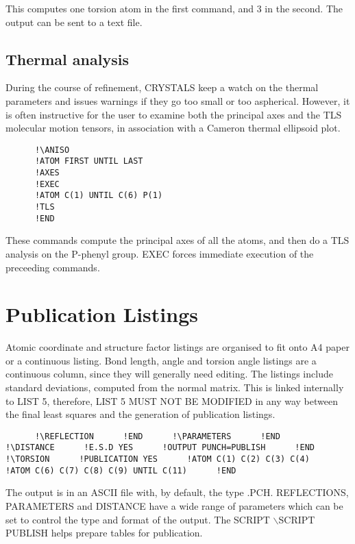 \documentclass[10pt,a4paper]{report}
\begin{document}
This computes one torsion atom in the first command, and 3 in the second.
 The output can be sent to a text file.




\section{Thermal analysis}


During the course of refinement, CRYSTALS keep a watch on the thermal
 parameters and issues warnings if they go too small or too aspherical.
 However, it is often instructive for the user to examine both the principal
 axes and the TLS molecular motion tensors, in
 association with a Cameron thermal ellipsoid plot.

\small\begin{verbatim}
      !\ANISO
      !ATOM FIRST UNTIL LAST
      !AXES
      !EXEC
      !ATOM C(1) UNTIL C(6) P(1)
      !TLS
      !END
\end{verbatim}\normalsize




These commands compute the principal axes of all the atoms, and then do a
 TLS analysis on the P-phenyl group. EXEC forces immediate execution of the
 preceeding commands.




\chapter{Publication Listings}


Atomic coordinate and structure factor listings are organised to fit onto A4 paper or a continuous listing. Bond length, angle and torsion angle listings are a continuous column, since they will generally need editing. The listings include standard deviations, computed from the normal matrix. This is linked internally to LIST 5, therefore, LIST 5 MUST NOT BE MODIFIED in any way between the final least squares and the generation of publication listings.\small\begin{verbatim}      !\REFLECTION      !END      !\PARAMETERS      !END      !\DISTANCE      !E.S.D YES      !OUTPUT PUNCH=PUBLISH      !END      !\TORSION      !PUBLICATION YES      !ATOM C(1) C(2) C(3) C(4)      !ATOM C(6) C(7) C(8) C(9) UNTIL C(11)      !END\end{verbatim}\normalsize



The output is in an ASCII file with, by default, the type .PCH.  REFLECTIONS, PARAMETERS and DISTANCE have a wide range of parameters which can be set to control the type and format of the output. The SCRIPT $\backslash$SCRIPT PUBLISH helps prepare tables for publication.
\end{document}
